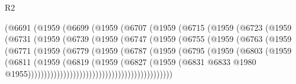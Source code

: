 \begin{lexlean}{R2}
\begin{coremodule}
                    (@6691
                      (@1959
                        (@6699
                          (@1959
                            (@6707
                              (@1959
                                (@6715
                                  (@1959
                                    (@6723
                                      (@1959
                                        (@6731
                                          (@1959
                                            (@6739
                                              (@1959
                                                (@6747
                                                  (@1959
                                                    (@6755
                                                      (@1959
                                                        (@6763
                                                          (@1959
                                                            (@6771
                                                              (@1959
                                                                (@6779
                                                                  (@1959
                                                                    (@6787
                                                                      (@1959
                                                                        (@6795
                                                                          (@1959
                                                                            (@6803
                                                                              (@1959
                                                                                (@6811
                                                                                  (@1959
                                                                                    (@6819
                                                                                      (@1959
                                                                                        (@6827
                                                                                          (@1959
                                                                                            (@6831
                                                                                              @6833
                                                                                              @1980
                                                                                              @1955)))))))))))))))))))))))))))))))))))))))))))))

\end{coremodule}
\end{lexlean}
